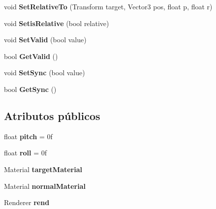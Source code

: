 \begin{DoxyCompactItemize}
void {\bfseries Set\+Relative\+To} (Transform target, Vector3 pos, float p, float r)
\item 
\mbox{\label{class_target_model_a6529efe1a8269e21f08730acf4115090}} 
void {\bfseries Setis\+Relative} (bool relative)
\item 
\mbox{\label{class_target_model_a2e4a1b3d4b27c14c3d2c7657af636b0f}} 
void {\bfseries Set\+Valid} (bool value)
\item 
\mbox{\label{class_target_model_a9bb012f5488eb24605440467601f3dfc}} 
bool {\bfseries Get\+Valid} ()
\item 
\mbox{\label{class_target_model_ab048bc78c22041dd77489f34d4cecf69}} 
void {\bfseries Set\+Sync} (bool value)
\item 
\mbox{\label{class_target_model_a6cb8e2993f269328e380670f9b545b80}} 
bool {\bfseries Get\+Sync} ()
\end{DoxyCompactItemize}
\subsection*{Atributos públicos}
\begin{DoxyCompactItemize}
\item 
\mbox{\label{class_target_model_a7586759a1d22048b40fa4f1cb0ec9b4a}} 
float {\bfseries pitch} = 0f
\item 
\mbox{\label{class_target_model_a3ce8f5a45b53a1996364e6e5e3663368}} 
float {\bfseries roll} = 0f
\item 
\mbox{\label{class_target_model_ae29e0799432fa79b04a4a2f9a5260ba3}} 
Material {\bfseries target\+Material}
\item 
\mbox{\label{class_target_model_a9944462b2a67606e945a45fea29b7650}} 
Material {\bfseries normal\+Material}
\item 
\mbox{\label{class_target_model_a0fde8af97987685b579466df499c8179}} 
Renderer {\bfseries rend}
\end{DoxyCompactItemize}
